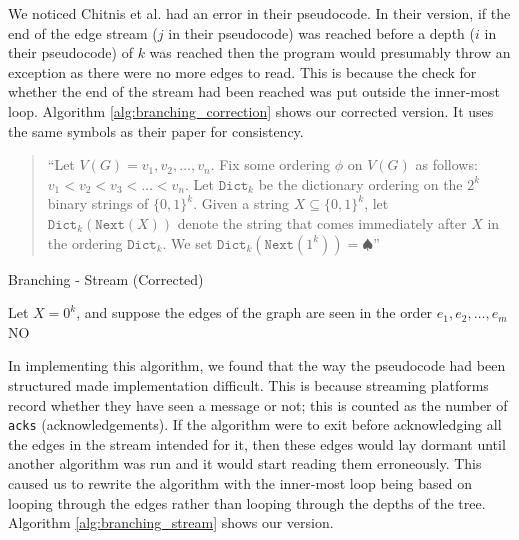We noticed Chitnis et al. had an error in their pseudocode. In their version,
if the end of the edge stream (\(j\) in their pseudocode) was reached before a
depth (\(i\) in their pseudocode) of \(k\) was reached then the program would
presumably throw an exception as there were no more edges to read. This is
because the check for whether the end of the stream had been reached was put
outside the inner-most loop. Algorithm \ref{alg:branching_correction} shows our
corrected version. It uses the same symbols as their paper for consistency.

\begin{quote}
    ``Let \(V (G) = {v_1, v_2, \dots , v_n}\). Fix some ordering \(\phi\) on
    \(V(G)\) as follows: \(v_1 < v_2 < v_3 < \dots < v_n\). Let \(\texttt{Dict}_k\) be
    the dictionary ordering on the \(2^k\) binary strings of \(\{0, 1\}^k\).
    Given a string \(X \subseteq \{0, 1\}^k\), let \(\texttt{Dict}_k(\texttt{Next}(X))\) denote
    the string that comes immediately after \(X\) in the ordering \(\texttt{Dict}_k\).
    We set \(\texttt{Dict}_k(\texttt{Next}(1^k)) = \spadesuit\)'' \cite{chitnis2019towards}
\end{quote}

\begin{algorithm}[htb]
    \caption{Branching - Stream (Corrected)}
    \label{alg:branching_correction}
    \DontPrintSemicolon


    Let $X = 0^k$, and suppose the edges of the graph are seen in the order $e_1, e_2, \dots, e_m$\;
    \Return NO
\end{algorithm}

In implementing this algorithm, we found that the way the pseudocode had been
structured made implementation difficult. This is because streaming platforms
record whether they have seen a message or not; this is counted as the number
of \texttt{acks} (acknowledgements). If the algorithm were to exit before
acknowledging all the edges in the stream intended for it, then these edges
would lay dormant until another algorithm was run and it would start reading
them erroneously. This caused us to rewrite the algorithm with the inner-most
loop being based on looping through the edges rather than looping through the
depths of the tree. Algorithm \ref{alg:branching_stream} shows our version.

